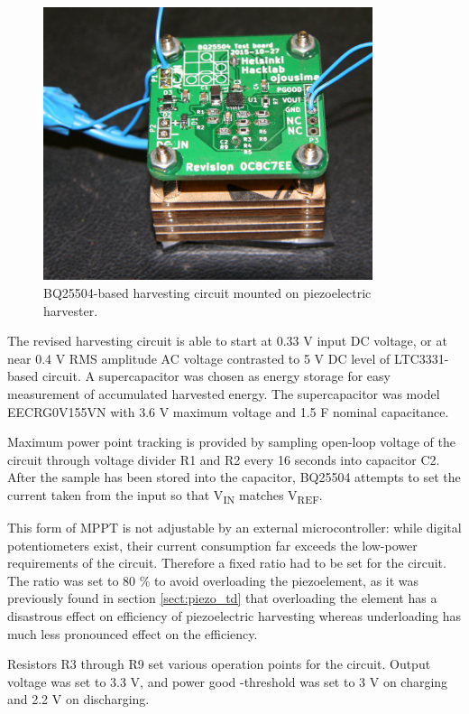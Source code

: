 \begin{figure}[htb]
\begin{center}
\includegraphics[height=8cm]{images/own_pic/tyre_fixture/piezo_bq_desk.jpg}
\end{center}
\caption{\label{fig:bq25504_mounted} BQ25504-based harvesting circuit mounted on piezoelectric harvester.}
\end{figure}

The revised harvesting circuit is able to start at 0.33 V input DC voltage, or at near 0.4 V RMS amplitude AC voltage contrasted to 5 V DC level of LTC3331-based circuit. A supercapacitor was chosen as energy storage for easy measurement of accumulated harvested energy. The supercapacitor was model EECRG0V155VN \cite{panasonic_scap} with 3.6 V maximum voltage and 1.5 F nominal capacitance. 

Maximum power point tracking is provided by sampling open-loop voltage of the circuit through voltage divider R1 and R2 every 16 seconds into capacitor C2. After the sample has been stored into the capacitor, BQ25504 attempts to set the current taken from the input so that V\textsubscript{IN} matches V\textsubscript{REF}. 

This form of MPPT is not adjustable by an external microcontroller: while digital potentiometers exist, their current consumption far exceeds the low-power requirements of the circuit. Therefore a fixed ratio had to be set for the circuit. The ratio was set to 80 \% to avoid overloading the piezoelement, as it was previously found in section \ref{sect:piezo_td} that overloading the element has a disastrous effect on efficiency of piezoelectric harvesting whereas underloading has much less pronounced effect on the efficiency.

Resistors R3 through R9 set various operation points for the circuit. Output voltage was set to 3.3 V, and power good -threshold was set to 3 V on charging and 2.2 V on discharging. 

